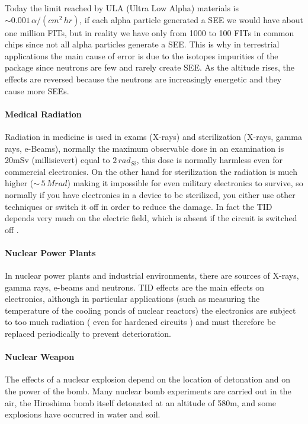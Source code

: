 {{{{{					Today the limit reached by ULA (Ultra Low Alpha) materials is $\sim 0.001\,\alpha/(cm^2\,hr)$, if each alpha particle generated a SEE we would have about one million FITs, but in reality we have only from 1000 to 100 FITs in common chips since not all alpha particles generate a SEE. This is why in terrestrial applications the main cause of error is due to the isotopes impurities of the package since neutrons are few and rarely create SEE. As the altitude rises, the effects are reversed because the neutrons are increasingly energetic and they cause more SEEs.  
					
				}%

				\paragraph{Medical Radiation}{
					Radiation in medicine is used in exams (X-rays) and sterilization (X-rays, gamma rays, e-Beams), normally the maximum observable dose in an examination is 20mSv (millisievert) equal to $2\,rad_{Si}$, this dose is normally harmless even for commercial electronics.  On the other hand for sterilization the radiation is much higher ($\sim\,5\,Mrad$) making it impossible for even military electronics to survive, so normally if you have electronics in a device to be sterilized, you either use other techniques or switch it off in order to reduce the damage. In fact the TID depends very much on the electric field, which is absent if the circuit is switched off .  
					
				}%
						
				\paragraph{Nuclear Power Plants}{
					In nuclear power plants and industrial environments, there are sources of X-rays, gamma rays, e-beams and neutrons. TID effects are the main effects on electronics, although in particular applications (such as measuring the temperature of the cooling ponds of nuclear reactors) the electronics are subject to too much radiation ( even for hardened circuits ) and must therefore be replaced periodically to prevent deterioration.
				} %
			
				\paragraph{Nuclear Weapon}{
					The effects of a nuclear explosion depend on the location of detonation and on the power of the bomb. Many nuclear bomb experiments are carried out in the air, the Hiroshima bomb itself detonated at an altitude of 580m, and some explosions have occurred in water and soil. 
					
}}}}}
